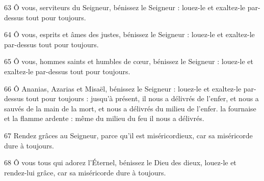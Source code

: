 \par 63 Ô vous, serviteurs du Seigneur, bénissez le Seigneur : louez-le et exaltez-le par-dessus tout pour toujours.
\par 64 Ô vous, esprits et âmes des justes, bénissez le Seigneur : louez-le et exaltez-le par-dessus tout pour toujours.
\par 65 Ô vous, hommes saints et humbles de cœur, bénissez le Seigneur : louez-le et exaltez-le par-dessus tout pour toujours.
\par 66 Ô Ananias, Azarias et Misaël, bénissez le Seigneur : louez-le et exaltez-le par-dessus tout pour toujours : jusqu'à présent, il nous a délivrés de l'enfer, et nous a sauvés de la main de la mort, et nous a délivrés du milieu de l'enfer. la fournaise et la flamme ardente : même du milieu du feu il nous a délivrés.
\par 67 Rendez grâces au Seigneur, parce qu'il est miséricordieux, car sa miséricorde dure à toujours.
\par 68 Ô vous tous qui adorez l'Éternel, bénissez le Dieu des dieux, louez-le et rendez-lui grâce, car sa miséricorde dure à toujours.

